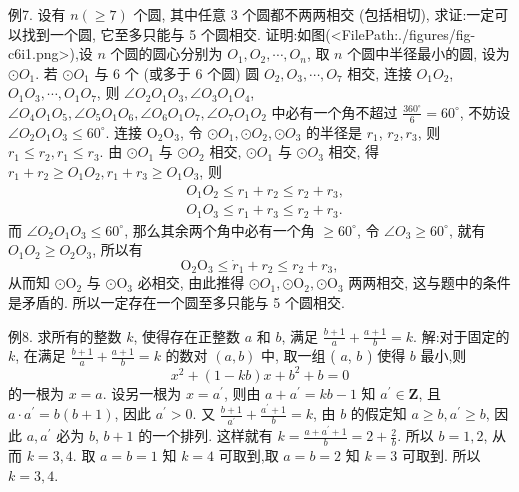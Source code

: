 例7. 设有 $n(\geqslant 7)$ 个圆, 其中任意 3 个圆都不两两相交 (包括相切), 求证:一定可以找到一个圆, 它至多只能与 5 个圆相交.
证明:如图(<FilePath:./figures/fig-c6i1.png>),设 $n$ 个圆的圆心分别为 $O_1, O_2, \cdots, O_n$, 取 $n$ 个圆中半径最小的圆, 设为 $\odot O_1$.
若 $\odot O_1$ 与 6 个 (或多于 6 个圆) 圆 $O_2, O_3, \cdots, O_7$ 相交, 连接 $O_1 O_2$,
$O_1 O_3, \cdots, O_1 O_7$, 则 $\angle O_2 O_1 O_3, \angle O_3 O_1 O_4$, $\angle O_4 O_1 O_5, \angle O_5 O_1 O_6, \angle O_6 O_1 O_7, \angle O_7 O_1 O_2$ 中必有一个角不超过 $\frac{360^{\circ}}{6}=60^{\circ}$, 不妨设 $\angle O_2 O_1 O_3 \leqslant 60^{\circ}$.
连接 $\mathrm{O}_2 \mathrm{O}_3$, 令 $\odot O_1, \odot O_2, \odot O_3$ 的半径是 $r_1$, $r_2, r_3$, 则 $r_1 \leqslant r_2, r_1 \leqslant r_3$.
由 $\odot O_1$ 与 $\odot O_2$ 相交, $\odot O_1$ 与 $\odot O_3$ 相交, 得 $r_1+ r_2 \geqslant O_1 O_2, r_1+r_3 \geqslant O_1 O_3$, 则
$$
\begin{aligned}
& O_1 O_2 \leqslant r_1+r_2 \leqslant r_2+r_3, \\
& O_1 O_3 \leqslant r_1+r_3 \leqslant r_2+r_3 .
\end{aligned}
$$
而 $\angle O_2 O_1 O_3 \leqslant 60^{\circ}$, 那么其余两个角中必有一个角 $\geqslant 60^{\circ}$, 令 $\angle O_3 \geqslant 60^{\circ}$, 就有 $O_1 O_2 \geqslant O_2 O_3$, 所以有
$$
\mathrm{O}_2 \mathrm{O}_3 \leqslant \dot{r}_1+r_2 \leqslant r_2+r_3,
$$
从而知 $\odot \mathrm{O}_2$ 与 $\odot \mathrm{O}_3$ 必相交, 由此推得 $\odot O_1, \odot \mathrm{O}_2, \odot \mathrm{O}_3$ 两两相交, 这与题中的条件是矛盾的.
所以一定存在一个圆至多只能与 5 个圆相交.



例8. 求所有的整数 $k$, 使得存在正整数 $a$ 和 $b$, 满足 $\frac{b+1}{a}+\frac{a+1}{b}=k$. 
解:对于固定的 $k$, 在满足 $\frac{b+1}{a}+\frac{a+1}{b}=k$ 的数对 $(a, b)$ 中, 取一组 ( $a$, $b$ ) 使得 $b$ 最小,则
$$
x^2+(1-k b) x+b^2+b=0
$$
的一根为 $x=a$.
设另一根为 $x=a^{\prime}$, 则由 $a+a^{\prime}=k b-1$ 知 $a^{\prime} \in \mathbf{Z}$, 且 $a \cdot a^{\prime}=b(b+1)$, 因此 $a^{\prime}>0$.
又 $\frac{b+1}{a^{\prime}}+\frac{a^{\prime}+1}{b}=k$, 由 $b$ 的假定知 $a \geqslant b, a^{\prime} \geqslant b$, 因此 $a, a^{\prime}$ 必为 $b$, $b+1$ 的一个排列.
这样就有 $k=\frac{a+a^{\prime}+1}{b}=2+\frac{2}{b}$.
所以 $b=1,2$, 从而 $k=3,4$.
取 $a=b=1$ 知 $k=4$ 可取到,取 $a=b=2$ 知 $k=3$ 可取到.
所以 $k=3,4$.



